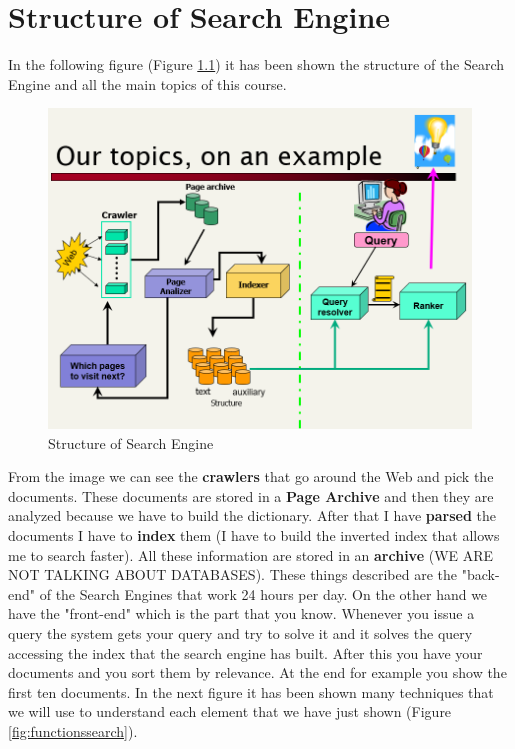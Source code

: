 \chapter{Structure of Search Engine}
In the following figure (Figure \ref{fig:searchengine}) it has been shown the structure of the Search Engine and all the main topics of this course.
\begin{figure}
    \centering
    \includegraphics[width=0.85\linewidth]{images/search.png}
    \caption{Structure of Search Engine}
    \label{fig:searchengine}
\end{figure}
From the image we can see the \textbf{crawlers} that go around the Web and pick the documents. These documents are stored in a \textbf{Page Archive} and then they are analyzed because we have to build the dictionary. After that I have \textbf{parsed} the documents I have to \textbf{index} them (I have to build the inverted index that allows me to search faster). All these information are stored in an \textbf{archive} (WE ARE NOT TALKING ABOUT DATABASES). These things described are the "back-end" of the Search Engines that work 24 hours per day.\newline
On the other hand we have the "front-end" which is the part that you know. Whenever you issue a query the system gets your query and try to solve it and it solves the query accessing the index that the search engine has built. After this you have your documents and you sort them by relevance. At the end for example you show the first ten documents.\newline
In the next figure it has been shown many techniques that we will use to understand each element that we have just shown (Figure \ref{fig:functionssearch}).
